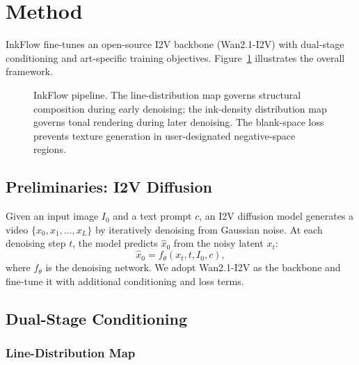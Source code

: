 \section{Method}
\label{sec:method}

InkFlow fine-tunes an open-source I2V backbone (Wan2.1-I2V) with
dual-stage conditioning and art-specific training objectives.
Figure~\ref{fig:pipeline} illustrates the overall framework.

\begin{figure}[t]
\centering
{}
\caption{InkFlow pipeline. The line-distribution map governs
structural composition during early denoising; the ink-density
distribution map governs tonal rendering during later denoising.
The blank-space loss prevents texture generation in
user-designated negative-space regions.}
\label{fig:pipeline}
\end{figure}

\subsection{Preliminaries: I2V Diffusion}

Given an input image $I_0$ and a text prompt $c$, an I2V diffusion
model generates a video $\{x_0, x_1, \ldots, x_L\}$ by iteratively
denoising from Gaussian noise. At each denoising step $t$, the
model predicts $\hat{x}_0$ from the noisy latent $x_t$:
\begin{equation}
\hat{x}_0 = f_\theta(x_t, t, I_0, c),
\end{equation}
where $f_\theta$ is the denoising network. We adopt Wan2.1-I2V as
the backbone and fine-tune it with additional conditioning and
loss terms.

\subsection{Dual-Stage Conditioning}
\label{sec:dual_condition}

\subsubsection{Line-Distribution Map}

